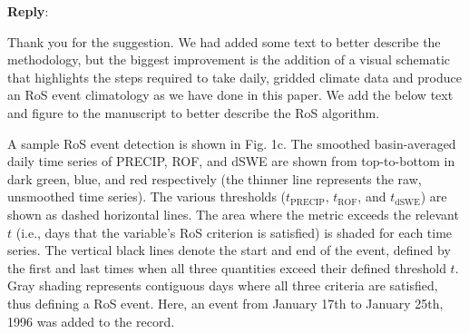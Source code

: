 \documentclass{article}
\newcommand{\reply}{\vspace{0.25cm} \textbf{Reply}:\ }
\begin{document}
\reply{
Thank you for the suggestion. We had added some text to better describe the methodology, but the biggest improvement is the addition of a visual schematic that highlights the steps required to take daily, gridded climate data and produce an RoS event climatology as we have done in this paper. We add the below text and figure to the manuscript to better describe the RoS algorithm.

{\color{Orange}
A sample RoS event detection is shown in Fig. 1c.
The smoothed basin-averaged daily time series of PRECIP, ROF, and dSWE are shown from top-to-bottom in dark green, blue, and red respectively (the thinner line represents the raw, unsmoothed time series).
The various thresholds ($t_{\textrm{PRECIP}}$, $t_{\textrm{ROF}}$, and $t_{\textrm{dSWE}}$) are shown as dashed horizontal lines. The area where the metric exceeds the relevant $t$ (i.e., days that the variable's RoS criterion is satisfied) is shaded for each time series.
The vertical black lines denote the start and end of the event, defined by the first and last times when all three quantities exceed their defined threshold $t$.
Gray shading represents contiguous days where all three criteria are satisfied, thus defining a RoS event. Here, an event from January 17th to January 25th, 1996 was added to the record.
}

}
\end{document}
